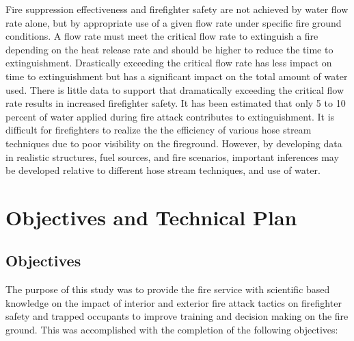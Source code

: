 \documentclass{article}
\begin{document}
Fire suppression effectiveness and firefighter safety are not achieved by water flow rate alone, but by appropriate use of a given flow rate under specific fire ground conditions. A flow rate must meet the critical flow rate to extinguish a fire depending on the heat release rate and should be higher to reduce the time to extinguishment. Drastically exceeding the critical flow rate has less impact on time to extinguishment but has a significant impact on the total amount of water used. There is little data to support that dramatically exceeding the critical flow rate results in increased firefighter safety. It has been estimated that only 5 to 10 percent of water applied during fire attack contributes to extinguishment. It is difficult for firefighters to realize the the efficiency of various hose stream techniques due to poor visibility on the fireground. However, by developing data in realistic structures, fuel sources, and fire scenarios, important inferences may be developed relative to different hose stream techniques, and use of water.

\clearpage

\section{Objectives and Technical Plan}

\subsection {Objectives}

The purpose of this study was to provide the fire service with scientific based knowledge on the impact of interior and exterior fire attack tactics on firefighter safety and trapped occupants to improve training and decision making on the fire ground. This was accomplished with the completion of the following objectives:
\end{document}
